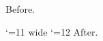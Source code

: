
\document
Before.

\midspace{2cm}\caption{Figure 1}
\catcode`\@=11
\setbox@ne\hbox{wide}\ifdim\wd@ne>\z@ Box: \box\@ne.\fi
\catcode`\@=12
After.
\enddocument
